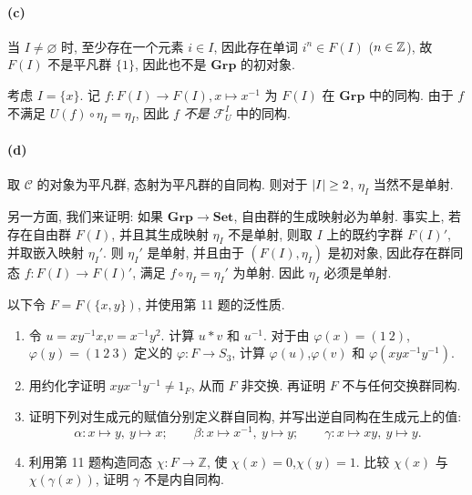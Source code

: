 \documentclass{article}
\begin{document}
\begin{solution}
	\paragraph{(c)} 当 $I \neq \varnothing$ 时, 至少存在一个元素 $i \in I$, 因此存在单词 $i^{n} \in F(I)$ ($n \in \mathbb{Z}$), 故 $F(I)$ 不是平凡群 $\{1\}$, 因此也不是 $\mathbf{Grp}$ 的初对象.

	考虑 $I = \{x\}$. 记 $f: F(I) \to F(I), x \mapsto x^{-1}$ 为 $F(I)$ 在 $\mathbf{Grp}$ 中的同构. 由于 $f$ 不满足 $U(f) \circ \eta_I = \eta_I$, 因此 $f$ \textit{不是} $\mathcal{F}_U^I$ 中的同构.

	\paragraph{(d)} 取 $\mathcal{C}$ 的对象为平凡群, 态射为平凡群的自同构. 则对于 $\left|I\right| \ge 2$, $\eta_I$ 当然不是单射. 

	另一方面, 我们来证明: 如果 $\mathbf{Grp} \to \mathbf{Set}$, 自由群的生成映射必为单射. 事实上, 若存在自由群 $F(I)$, 并且其生成映射 $\eta_I$ 不是单射, 则取 $I$ 上的既约字群 $F(I)'$, 并取嵌入映射 $\eta_I'$. 则 $\eta_I'$ 是单射, 并且由于 $(F(I), \eta_I)$ 是初对象, 因此存在群同态 $f: F(I) \to F(I)'$, 满足 $f \circ \eta_I = \eta_I'$ 为单射. 因此 $\eta_I$ 必须是单射.
\end{solution}



\begin{problem}
  以下令 $F=F(\{x,y\})$, 并使用第 11 题的泛性质.
  \begin{enumerate}
    \item[(a)] 令 $u=xy^{-1}x$,$v=x^{-1}y^2$. 计算 $u*v$ 和 $u^{-1}$. 对于由 $\varphi(x)=(1\ 2)$,$\varphi(y)=(1\ 2\ 3)$ 定义的 $\varphi:F\to S_3$, 计算 $\varphi(u)$,$\varphi(v)$ 和 $\varphi(xyx^{-1}y^{-1})$.
    \item[(b)] 用约化字证明 $xyx^{-1}y^{-1}\neq1_F$, 从而 $F$ 非交换. 再证明 $F$ 不与任何交换群同构.
    \item[(c)] 证明下列对生成元的赋值分别定义群自同构, 并写出逆自同构在生成元上的值:
      \[
        \alpha:x\mapsto y,\ y\mapsto x;\qquad
        \beta:x\mapsto x^{-1},\ y\mapsto y;\qquad
        \gamma:x\mapsto xy,\ y\mapsto y.
      \]
    \item[(d)] 利用第 11 题构造同态 $\chi:F\to\mathbb Z$, 使 $\chi(x)=0$,$\chi(y)=1$. 比较 $\chi(x)$ 与 $\chi(\gamma(x))$, 证明 $\gamma$ 不是内自同构.
  \end{enumerate}
\end{problem}
\end{document}
